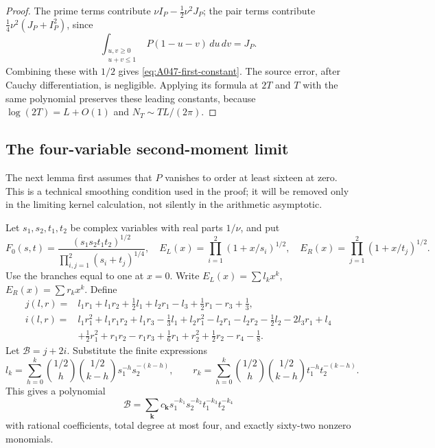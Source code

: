 \begin{proof}
The prime terms contribute
\(\nu I_P-\frac12\nu^2J_P\); the pair terms contribute
\(\frac14\nu^2(J_P+I_P^2)\), since
\[
 \int_{\substack{u,v\ge0\\u+v\le1}}P(1-u-v)\,du\,dv=J_P.
\]
Combining these with \(1/2\) gives
\eqref{eq:A047-first-constant}.  The source error, after
Cauchy differentiation, is negligible.  Applying its
formula at \(2T\) and \(T\) with the same polynomial
preserves these leading constants, because
\(\log(2T)=L+O(1)\) and \(N_T\sim TL/(2\pi)\).
\end{proof}

\subsection*{The four-variable second-moment limit}

The next lemma first assumes that \(P\) vanishes to order at
least sixteen at zero.  This is a technical smoothing
condition used in the proof; it will be removed only in
the limiting kernel calculation, not silently in the
arithmetic asymptotic.

Let \(s_1,s_2,t_1,t_2\) be complex variables with real parts
\(1/\nu\), and put
\[
 F_0(s,t)=
  \frac{(s_1s_2t_1t_2)^{1/2}}
             {\prod_{i,j=1}^2(s_i+t_j)^{1/4}},
 \quad
 E_L(x)=\prod_{i=1}^2(1+x/s_i)^{1/2},\quad
 E_R(x)=\prod_{j=1}^2(1+x/t_j)^{1/2}.
\]
Use the branches equal to one at \(x=0\).
Write \(E_L(x)=\sum l_kx^k\),
\(E_R(x)=\sum r_kx^k\).  Define
\begin{align}
 j(l,r)={}&l_1r_1+l_1r_2+\tfrac12l_1+l_2r_1-l_3
                                      +\tfrac12r_1-r_3+\tfrac13,
                                                    \label{eq:A047-j}\\
 i(l,r)={}&l_1r_1^2+l_1r_1r_2+l_1r_3-\tfrac13l_1
       +l_2r_1^2-l_2r_1-l_2r_2-\tfrac12l_2
       -2l_3r_1+l_4 \nonumber\\
       &+\tfrac12r_1^2+r_1r_2-r_1r_3+\tfrac16r_1
                          +r_2^2+\tfrac12r_2-r_4-\tfrac18.
                                                    \label{eq:A047-i}
\end{align}
Let \(\mathscr B=j+2i\).  Substitute the finite expressions
\[
 l_k=\sum_{h=0}^k
       {1/2\choose h}{1/2\choose k-h}s_1^{-h}s_2^{-(k-h)},
 \qquad
 r_k=\sum_{h=0}^k
       {1/2\choose h}{1/2\choose k-h}t_1^{-h}t_2^{-(k-h)}.
\]
This gives a polynomial
\[
 \mathscr B=\sum_{\mathbf k}c_{\mathbf k}
           s_1^{-k_1}s_2^{-k_2}t_1^{-k_3}t_2^{-k_4}
\]
with rational coefficients, total degree at most four,
and exactly sixty-two nonzero monomials.

